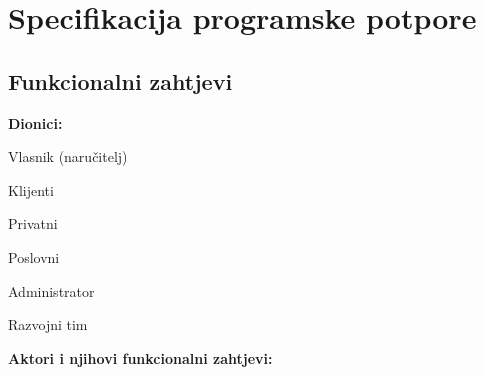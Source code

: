 \chapter{Specifikacija programske potpore}
		
	\section{Funkcionalni zahtjevi}
			
			
				
			
			
			\noindent \textbf{Dionici:}
			
			\begin{packed_enum}
				
				\item Vlasnik (naručitelj)
				\item Klijenti
				\begin{packed_enum}
					\item Privatni
					\item Poslovni
				\end{packed_enum}				
				\item Administrator
				\item Razvojni tim
				
			\end{packed_enum}
			
			\noindent \textbf{Aktori i njihovi funkcionalni zahtjevi:}
			
